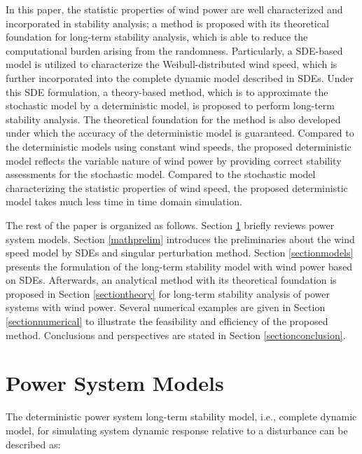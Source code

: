 \documentclass[journal]{IEEEtran}
\begin{document}
In this paper, the statistic properties of wind power are well characterized and incorporated in stability analysis; a method is proposed with its theoretical foundation for long-term stability analysis, which is able to reduce the computational burden arising from the randomness. Particularly, a SDE-based model \cite{Milano:2013_1} is utilized to characterize the Weibull-distributed wind speed, which is further incorporated into the complete dynamic model described in SDEs. Under this SDE formulation, a theory-based method, which is to approximate the stochastic model by a deterministic model, is proposed to perform long-term stability analysis. The theoretical foundation for the method is also developed under which the accuracy of the deterministic model is guaranteed. Compared to the deterministic models using constant wind speeds, the proposed deterministic model reflects the variable nature of wind power by providing correct stability assessments for the stochastic model. Compared to the stochastic model characterizing the statistic properties of wind speed, the proposed deterministic model takes much less time in time domain simulation.












The rest of the paper is organized as follows. Section \ref{sectionpowermodels} briefly reviews power system models. Section \ref{mathprelim} introduces the preliminaries about the wind speed model by SDEs and singular perturbation method. Section \ref{sectionmodels} presents the formulation of the long-term stability model with wind power based on SDEs. Afterwards, an analytical method with its theoretical foundation is proposed in Section \ref{sectiontheory} for long-term stability analysis of power systems with wind power. Several numerical examples are given in Section \ref{sectionnumerical} to illustrate the feasibility and efficiency of the proposed method. Conclusions and perspectives are stated in Section \ref{sectionconclusion}.






\section{Power System Models}\label{sectionpowermodels}
The deterministic power system long-term stability model, i.e., complete dynamic model, for simulating system dynamic response relative to a disturbance can be described as:
\end{document}
